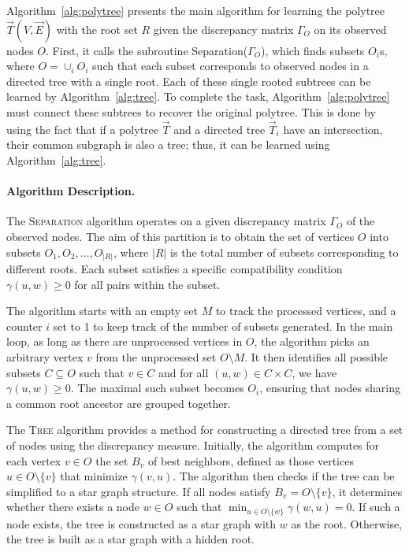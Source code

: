 \documentclass[11pt,a4paper]{article}
\numberwithin{equation}{section}
\begin{document}
Algorithm~\ref{alg:polytree} presents the main algorithm for learning the polytree $\vec{T}(V, \vec{E})$ with the root set $R$ given the discrepancy matrix $\Gamma_O$ on its observed nodes $O$. First, it calls the subroutine Separation($\Gamma_O$), which finds subsets $O_i$s, where $O = \cup_i O_i$ such that each subset corresponds to observed nodes in a directed tree with a single root. Each of these single rooted subtrees can be learned by Algorithm~\ref{alg:tree}. To complete the task, Algorithm~\ref{alg:polytree} must connect these subtrees to recover the original polytree. This is done by using the fact that if a polytree $\vec{T}$ and a directed tree $\vec{T}_i$ have an intersection, their common subgraph is also a tree; thus, it can be learned using Algorithm~\ref{alg:tree}.

\paragraph{Algorithm Description.}
The \textsc{Separation} algorithm operates on a given discrepancy matrix $\Gamma_O$ of the observed nodes. The aim of this partition is to obtain the set of vertices $O$ into subsets $O_1, O_2, \ldots, O_{|R|}$, where $|R|$ is the total number of subsets corresponding to different roots. Each subset satisfies a specific compatibility condition $\gamma(u, w) \geq 0$ for all pairs within the subset.

The algorithm starts with an empty set $M$ to track the processed vertices, and a counter $i$ set to 1 to keep track of the number of subsets generated. In the main loop, as long as there are unprocessed vertices in $O$, the algorithm picks an arbitrary vertex $v$ from the unprocessed set $O \setminus M$. It then identifies all possible subsets $C \subseteq O$ such that $v \in C$ and for all $(u,w) \in C \times C$, we have $\gamma(u,w) \geq 0$. The maximal such subset becomes $O_i$, ensuring that nodes sharing a common root ancestor are grouped together.

The \textsc{Tree} algorithm provides a method for constructing a directed tree from a set of nodes using the discrepancy measure. Initially, the algorithm computes for each vertex $v \in O$ the set $B_v$ of best neighbors, defined as those vertices $u \in O \setminus \{v\}$ that minimize $\gamma(v,u)$. The algorithm then checks if the tree can be simplified to a star graph structure. If all nodes satisfy $B_v = O \setminus \{v\}$, it determines whether there exists a node $w \in O$ such that $\min_{u \in O \setminus \{w\}} \gamma(w,u) = 0$. If such a node exists, the tree is constructed as a star graph with $w$ as the root. Otherwise, the tree is built as a star graph with a hidden root.
\end{document}
